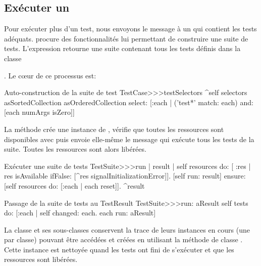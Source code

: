 \documentclass[a4paper,10pt,twoside]{book}
\begin{document}
\subsection{Exécuter un }
Pour exécuter plus d'un test, nous envoyons le message  à un  qui contient les tests adéquats.  procure des fonctionnalités lui permettant de construire  une suite de tests. L'expression  retourne une suite contenant tous les tests définis dans la classe {. Le c{\oe}ur de ce processus est:

\begin{method}[testcasetestselectors]{Auto-construction de la suite de test}
TestCase>>>testSelectors 
	^self selectors asSortedCollection asOrderedCollection select: [:each | 
		('test*' match: each) and: [each numArgs isZero]]
\end{method}

La méthode  crée une instance de , vérifie que toutes les ressources sont disponibles avec  puis envoie elle-même le message  qui exécute tous les tests de la suite. Toutes les ressources sont alors libérées.

\begin{method}[testsuiterun]{Exécuter une suite de tests}
TestSuite>>>run
	| result |
  self resources do: [ :res |
		res isAvailable ifFalse: [^res signalInitializationError]].
	[self run: result] ensure: [self resources do: [:each | each reset]].
	^result
\end{method}


\begin{method}[testsuiterun:]{Passage de la suite de tests au TestResult}
TestSuite>>>run: aResult
	self tests do: [:each |
	  self changed: each.
	  each run: aResult]
\end{method}
La classe  et ses sous-classes conservent la trace de leurs instances en cours (une par classe) pouvant être accédées et créées en utilisant la méthode de classe . Cette instance est nettoyée quand les tests ont fini de s'exécuter et que les ressources sont libérées.


}
\end{document}
